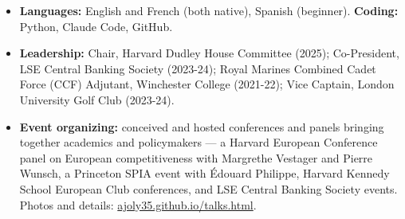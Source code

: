 \documentclass[10.5pt,a4paper]{article}
\newcommand{\cvsection}[1]{\vspace{3pt}\noindent{\bfseries #1}\par\vspace{-7pt}\noindent\hrulefill\par\vspace{1pt}}
\newenvironment{tight}{\begin{itemize}\setlength{\itemsep}{0pt}\setlength{\parskip}{0pt}\setlength{\topsep}{0pt}\setlength{\partopsep}{0pt}}{\end{itemize}}
\begin{document}
\cvsection{Skills \& Leadership}
\begin{tight}
\item \textbf{Languages:} English and French (both native), Spanish (beginner). \quad \textbf{Coding:} Python, Claude Code, GitHub.
\item \textbf{Leadership:} Chair, Harvard Dudley House Committee (2025); Co-President, LSE Central Banking Society (2023-24); Royal Marines Combined Cadet Force (CCF) Adjutant, Winchester College (2021-22); Vice Captain, London University Golf Club (2023-24).
\item \textbf{Event organizing:} conceived and hosted conferences and panels bringing together academics and policymakers --- a Harvard European Conference panel on European competitiveness with Margrethe Vestager and Pierre Wunsch, a Princeton SPIA event with \'Edouard Philippe, Harvard Kennedy School European Club conferences, and LSE Central Banking Society events. Photos and details: \href{https://ajoly35.github.io/talks.html}{ajoly35.github.io/talks.html}.
\end{tight}
\end{document}
